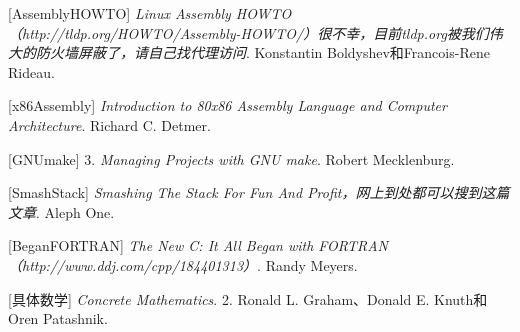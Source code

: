 \begin{BookBibliographyEntry}

[AssemblyHOWTO] \emph{Linux Assembly HOWTO（http:\BookSplit{}/\BookSplit{}/\BookSplit{}tldp.\BookSplit{}org/\BookSplit{}HOWTO/\BookSplit{}Assembly-HOWTO/\BookSplit{}）很不幸，目前tldp.\BookSplit{}org被我们伟大的防火墙屏蔽了，请自己找代理访问}. Konstantin Boldyshev和Francois-Rene Rideau.

\end{BookBibliographyEntry}

\begin{BookBibliographyEntry}

[x86Assembly] \emph{Introduction to 80x86 Assembly Language and Computer Architecture}. Richard C.\BookSplit{} Detmer.

\end{BookBibliographyEntry}

\begin{BookBibliographyEntry}

[GNUmake] 3.\BookSplit{} \emph{Managing Projects with GNU make}. Robert Mecklenburg.

\end{BookBibliographyEntry}

\begin{BookBibliographyEntry}

[SmashStack] \emph{Smashing The Stack For Fun And Profit，网上到处都可以搜到这篇文章}. Aleph One.

\end{BookBibliographyEntry}

\begin{BookBibliographyEntry}

[BeganFORTRAN] \emph{The New C:\BookSplit{} It All Began with FORTRAN（http:\BookSplit{}/\BookSplit{}/\BookSplit{}www.\BookSplit{}ddj.\BookSplit{}com/\BookSplit{}cpp/\BookSplit{}184401313）}. Randy Meyers.

\end{BookBibliographyEntry}

\begin{BookBibliographyEntry}

[具体数学] \emph{Concrete Mathematics}. 2.\BookSplit{} Ronald L.\BookSplit{} Graham、Donald E.\BookSplit{} Knuth和Oren Patashnik.

\end{BookBibliographyEntry}


